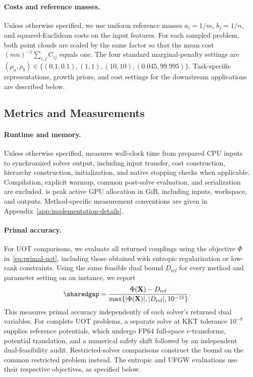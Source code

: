 \paragraph{Costs and reference masses.}
Unless otherwise specified, we use uniform reference masses $a_i=1/m$, $b_j=1/n$, and squared-Euclidean costs on the input features.
For each sampled problem, both point clouds are scaled by the same factor so that the mean cost $(mn)^{-1}\sum_{i,j}C_{ij}$ equals one.
The four standard marginal-penalty settings are $(\rho_a,\rho_b)\in\{(0.1,0.1),(1,1),(10,10),(0.045,99.995)\}$.
Task-specific representations, growth priors, and cost settings for the downstream applications are described below.

\subsection{Metrics and Measurements}
\label{app:experiment-metrics}

\paragraph{Runtime and memory.}
Unless otherwise specified, \runtime measures wall-clock time from prepared CPU inputs to synchronized solver output, including input transfer, cost construction, hierarchy construction, initialization, and native stopping checks when applicable.
Compilation, explicit warmup, common post-solve evaluation, and serialization are excluded.
\gpumem is peak active GPU allocation in GiB, including inputs, workspace, and outputs.
Method-specific measurement conventions are given in Appendix~\ref{app:implementation-details}.

\paragraph{Primal accuracy.}
For UOT comparisons, we evaluate all returned couplings using the objective $\Phi$ in~\eqref{eq:primal-uot}, including those obtained with entropic regularization or low-rank constraints.
Using the same feasible dual bound $D_{\mathrm{ref}}$ for every method and parameter setting on an instance, we report
\begin{equation}
\sharedgap=\frac{\Phi(\mathbf X)-D_{\mathrm{ref}}}{\max\{|\Phi(\mathbf X)|,|D_{\mathrm{ref}}|,10^{-15}\}}.
\label{eq:experimental-shared-gap}
\end{equation}
This measures primal accuracy independently of each solver's returned dual variables.
For complete UOT problems, a separate \ours solve at KKT tolerance $10^{-8}$ supplies reference potentials, which undergo FP64 full-space c-transforms, potential translation, and a numerical safety shift followed by an independent dual-feasibility audit.
Restricted-solver comparisons construct the bound on the common restricted problem instead.
The entropic and UFGW evaluations use their respective objectives, as specified below.

